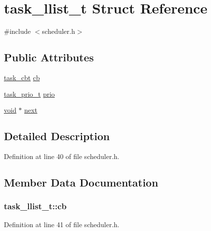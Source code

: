 \hypertarget{structtask__llist__t}{}\section{task\+\_\+llist\+\_\+t Struct Reference}
\label{structtask__llist__t}


{\ttfamily \#include $<$scheduler.\+h$>$}

\subsection*{Public Attributes}
\begin{DoxyCompactItemize}
\item 
\hyperlink{group___scheduler_gad18d3f32b9193516d5f1849adc9d434e}{task\+\_\+cbt} \hyperlink{structtask__llist__t_a7a671c60b8ba255565691831f8e05235}{cb}
\item 
\hyperlink{group___scheduler_gaf646a0e571d9fb8ee8c4f7291d407965}{task\+\_\+prio\+\_\+t} \hyperlink{structtask__llist__t_a03183c01a3847e5ba92c7861a98fc33e}{prio}
\item 
\hyperlink{usb__devapi_8h_afabf60e7f57651d6d595a02c75f07cd0}{void} $\ast$ \hyperlink{structtask__llist__t_a477d82d89c810ba1d2f5b79bf38f24a4}{next}
\end{DoxyCompactItemize}


\subsection{Detailed Description}


Definition at line 40 of file scheduler.\+h.



\subsection{Member Data Documentation}
\subsubsection[{\texorpdfstring{cb}{cb}}]{ task\+\_\+llist\+\_\+t\+::cb}\hypertarget{structtask__llist__t_a7a671c60b8ba255565691831f8e05235}{}\label{structtask__llist__t_a7a671c60b8ba255565691831f8e05235}


Definition at line 41 of file scheduler.\+h.

